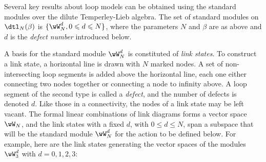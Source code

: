 \documentclass[11pt]{article}
\numberwithin{equation}{section}
\theoremstyle{alexi}
\renewcommand{\leq}{\leqslant}
\begin{document}
Several key results about loop models can be obtained using the standard modules over the dilute Temperley-Lieb algebra. The set of standard modules on $\dtl_N(\beta)$ is $\{\wW_{N}^d,0\leq d\leq N\}$, where the parameters $N$ and $\beta$ are as above and $d$ is the {\it defect number} introduced below.

A basis for the standard module $\wW_{N}^d$ is constituted of {\it link states}. To construct a link state, a horizontal line is drawn with $N$ marked nodes. A set of non-intersecting loop segments is added above the horizontal line, each one either connecting two nodes together or connecting a node to infinity above. A loop segment of the second type is called a \textit{defect}, and the number of defects is denoted $d$. Like those in a connectivity, the nodes of a link state may be left vacant. The formal linear combinations of link diagrams forms a vector space $\wW_{N}$, and the link states with a fixed $d$, with $0\leq d\leq N$, span a subspace that will be the standard module $\wW_{N}^d$ for the action to be defined below. For example, here are the link states generating the vector spaces of the modules $\wW_3^d$ with $d=0,1,2,3$:
\end{document}

